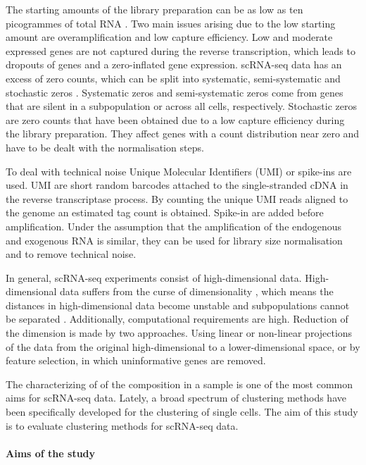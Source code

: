 \documentclass[12pt, a4paper]{article}\usepackage[]{graphicx}\usepackage[]{color}
\begin{document}
The starting amounts of the library preparation can be as low as ten picogrammes of total RNA \citep{picelli2013smart}. Two main issues arising due to the low starting amount are  overamplification and low capture efficiency. Low and moderate expressed genes are not captured during the reverse transcription, which leads to dropouts of genes and a zero-inflated gene expression. scRNA-seq data has an excess of zero counts, which can be split into systematic, semi-systematic and stochastic zeros \citep{lun2016pooling}. Systematic zeros and semi-systematic zeros come from genes that are silent in a subpopulation or across all cells, respectively. 
Stochastic zeros are zero counts that have been obtained due to a low capture efficiency during the library preparation. They affect genes with a count distribution near zero and have to be dealt with the normalisation steps.  
 
To deal with technical noise Unique Molecular Identifiers (UMI) or spike-ins are used. UMI are short random barcodes attached to the single-stranded cDNA in the reverse transcriptase process. By counting the unique UMI reads aligned to the genome an estimated tag count is obtained. Spike-in are added before amplification. Under the assumption that the amplification of the endogenous and exogenous RNA is similar, they can be used for library size normalisation and to remove technical noise. 

In general, scRNA-seq experiments consist of high-dimensional data. High-dimensional data suffers from the curse of dimensionality \citep{wagner2016revealing}, which means the distances in high-dimensional data become unstable and subpopulations cannot be separated \citep{andrews2017identifying}. Additionally, computational requirements are high. Reduction of the dimension is made by two approaches. Using linear or non-linear projections of the data from the original high-dimensional to a lower-dimensional space, or by feature selection, in which uninformative genes are removed.

The characterizing of of the composition in a sample is one of the most common aims for scRNA-seq data. Lately, a broad spectrum of clustering methods have been specifically developed for the clustering of single cells. The aim of this study is to evaluate clustering methods for scRNA-seq data.

\paragraph{Aims of the study}
\end{document}
